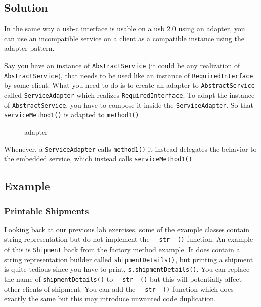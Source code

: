 \subsection{Solution}\label{structural-patterns.md__solution-1}

In the same way a usb-c interface is usable on a usb 2.0 using an
adapter, you can use an incompatible service on a client as a compatible
instance using the adapter pattern.

Say you have an instance of \texttt{AbstractService} (it could be any
realization of \texttt{AbstractService}), that needs to be used like an
instance of \texttt{RequiredInterface} by some client. What you need to
do is to create an adapter to \texttt{AbstractService} called
\texttt{ServiceAdapter} which realizes \texttt{RequiredInterface}. To
adapt the instance of \texttt{AbstractService}, you have to compose it
inside the \texttt{ServiceAdapter}. So that \texttt{serviceMethod1()} is
adapted to \texttt{method1()}.

\begin{figure}
\centering
\pandocbounded{}
\caption{adapter}
\end{figure}

Whenever, a \texttt{ServiceAdapter} calls \texttt{method1()} it instead
delegates the behavior to the embedded service, which instead calls
\texttt{serviceMethod1()}

\subsection{Example}\label{structural-patterns.md__example-1}

\subsubsection{Printable
Shipments}\label{structural-patterns.md__printable-shipments}

Looking back at our previous lab exercises, some of the example classes
contain string representation but do not implement the
\texttt{\_\_str\_\_()} function. An example of this is \texttt{Shipment}
back from the factory method example. It does contain a string
representation builder called \texttt{shipmentDetails()}, but printing a
shipment is quite tedious since you have to print,
\texttt{s.shipmentDetails()}. You can replace the name of
\texttt{shipmentDetails()} to \texttt{\_\_str\_\_()} but this will
potentially affect other clients of shipment. You can add the
\texttt{\_\_str\_\_()} function which does exactly the same but this may
introduce unwanted code duplication.

